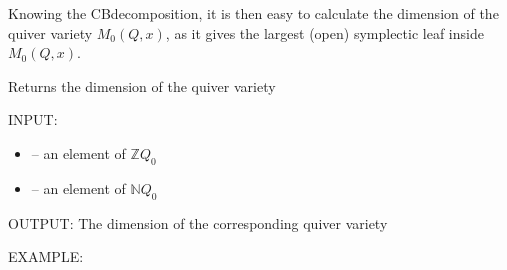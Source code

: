 \documentclass[letterpaper,10pt,english]{sphinxmanual}
\begin{document}
\sphinxAtStartPar
Knowing the CB\sphinxhyphen{}decomposition, it is then easy to calculate the dimension of the quiver variety \(M_0(Q,x)\), as it gives the largest (open) symplectic leaf inside \(M_0(Q,x)\).

\begin{fulllineitems}
\label{\detokenize{index:quivercombinatorics.quivercombinatorics.Quiver.quiver_variety_dimension}}
\pysigstartsignatures
\pysiglinewithargsret
{}
{\sphinxparamcomma {}}
{}
\pysigstopsignatures
\sphinxAtStartPar
Returns the dimension of the quiver variety

\sphinxAtStartPar
INPUT:
\begin{itemize}
\item {} 
\sphinxAtStartPar
{} – an element of \(\mathbb{Z}Q_0\)

\item {} 
\sphinxAtStartPar
{} – an element of \(\mathbb{N}Q_0\)

\end{itemize}

\sphinxAtStartPar
OUTPUT: The dimension of the corresponding quiver variety

\sphinxAtStartPar
EXAMPLE:

\begin{sphinxVerbatim}[commandchars=\\\{\}]
  
   \PYG{p}{[}\PYG{p}{[} \PYG{p}{]}\PYG{p}{[} \PYG{p}{]}\PYG{p}{]}
    
\end{sphinxVerbatim}

\end{fulllineitems}
\end{document}
